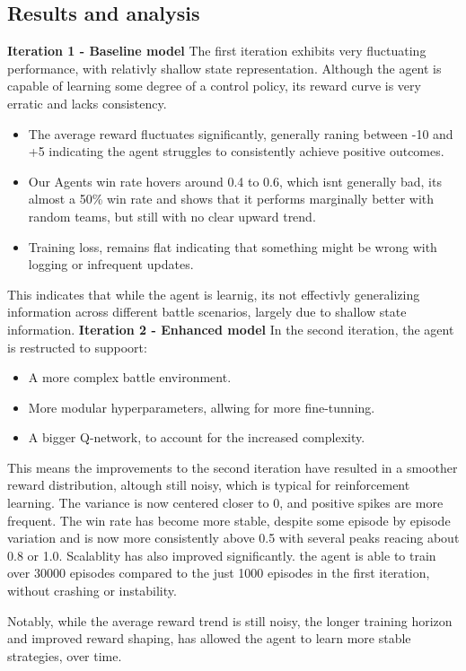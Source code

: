 \subsection{Results and analysis}
\textbf{Iteration 1 - Baseline model}
The first iteration exhibits very fluctuating performance, with relativly shallow
state representation. Although the agent is capable of learning some degree of a control
policy, its reward curve is very erratic and lacks consistency.
\begin{itemize}
    \item The average reward fluctuates significantly, generally raning between -10 and +5
          indicating the agent struggles to consistently achieve positive outcomes.
    \item Our Agents win rate hovers around 0.4 to 0.6, which isnt generally bad, its almost a 50\% win rate
          and shows that it performs marginally better with random teams, but still with no clear upward trend.
    \item Training loss, remains flat indicating that something might be wrong with logging or infrequent updates.
\end{itemize}
This indicates that while the agent is learnig, its not effectivly generalizing
information across different battle scenarios, largely due to shallow state information.
\newline
\textbf{Iteration 2 - Enhanced model}
In the second iteration, the agent is restructed to suppoort:
\begin{itemize}
    \item A more complex battle environment.
    \item More modular hyperparameters, allwing for more fine-tunning.
    \item A bigger Q-network, to account for the increased complexity.
\end{itemize}
This means the improvements to the second iteration have resulted in a smoother reward
distribution, altough still noisy, which is typical for reinforcement learning. The variance
is now centered closer to 0, and positive spikes are more frequent. The win rate
has become more stable, despite some episode by episode variation
and is now more consistently above 0.5 with several peaks reacing about 0.8 or 1.0.
Scalablity has also improved significantly. the agent is able to train over 30000 episodes
compared to the just 1000 episodes in the first iteration, without crashing or instability.

Notably, while the average reward trend is still noisy, the longer training horizon
and improved reward shaping, has allowed the agent to learn more stable strategies, over time.

